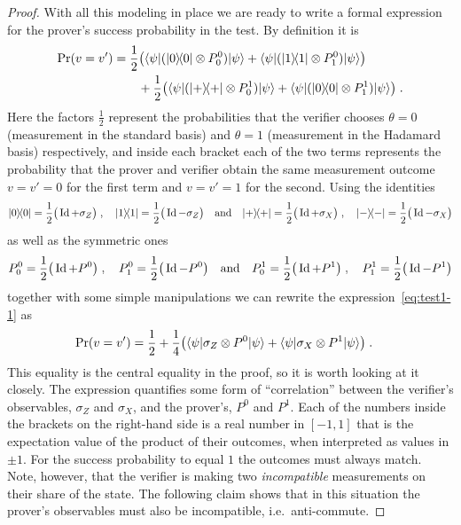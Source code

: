 \begin{proof}
With all this modeling in place we are ready to write a formal expression for the prover's success probability in the test. By definition it is 
\begin{align}
\Pr(v=v') &= \frac{1}{2}\big( \langle{\psi}| (|0\rangle\!\langle0| \otimes P^0_0) |{\psi}\rangle +  \langle{\psi}| (|1\rangle\!\langle1| \otimes P^0_1) |{\psi}\rangle\big)\notag\\
&\qquad  + \frac{1}{2}\big( \langle{\psi}|( |+\rangle\!\langle+| \otimes P^1_0 )|{\psi}\rangle +  \langle{\psi}| (|0\rangle\!\langle0| \otimes P^1_1 )|{\psi}\rangle \big) \;.\label{eq:test1-1}
\end{align}
Here the factors $\frac{1}{2}$ represent the probabilities that the verifier chooses $\theta=0$ (measurement in the standard basis) and $\theta=1$ (measurement in the Hadamard basis) respectively, and inside each bracket each of the two terms represents the probability that the prover and verifier obtain the same measurement outcome $v=v'=0$ for the first term and $v=v'=1$ for the second. 
Using the identities 
\[ |0\rangle\!\langle0| = \frac{1}{2}\big(\mathop{\rm Id}\nolimits+\sigma_Z \big)\;,\quad |1\rangle\!\langle1| = \frac{1}{2}\big(\mathop{\rm Id}\nolimits-\sigma_Z \big) \quad \text{and}\quad|+\rangle\!\langle+| = \frac{1}{2}\big(\mathop{\rm Id}\nolimits+\sigma_X \big)\;,\quad |-\rangle\!\langle-| = \frac{1}{2}\big(\mathop{\rm Id}\nolimits-\sigma_X \big)\]
as well as the symmetric ones 
\[ P^0_0 = \frac{1}{2}\big( \mathop{\rm Id}\nolimits + P^0\big)\;,\quad P^0_1 = \frac{1}{2}\big(\mathop{\rm Id}\nolimits - P^0\big)\quad\text{and}\quad P^1_0 = \frac{1}{2}\big( \mathop{\rm Id}\nolimits + P^1\big)\;, \quad P^1_1 = \frac{1}{2}\big(\mathop{\rm Id}\nolimits - P^1\big)\]
together with some simple manipulations
 we can rewrite the expression~\eqref{eq:test1-1} as 
\begin{align}
\Pr(v=v') &= \frac{1}{2} + \frac{1}{4}\big( \langle{\psi}| \sigma_Z \otimes P^0 |{\psi}\rangle+  \langle{\psi}| \sigma_X \otimes P^1 |{\psi}\rangle \big)\;.\label{eq:qubit-1-a}
\end{align}
This equality is the central equality in the proof, so it is worth looking at it closely. The expression quantifies some form of ``correlation'' between the verifier's observables, $\sigma_Z$ and $\sigma_X$, and the prover's, $P^0$ and $P^1$. Each of the numbers inside the brackets on the right-hand side is a real number in $[-1,1]$ that is the expectation value of the product of their outcomes, when interpreted as values in $\pm 1$. For the success probability to equal $1$ the outcomes must always match. Note, however, that the verifier is making two \emph{incompatible} measurements on their share of the state. The following claim shows that in this situation the prover's observables must also be incompatible, i.e.\ anti-commute. 


\end{proof}
